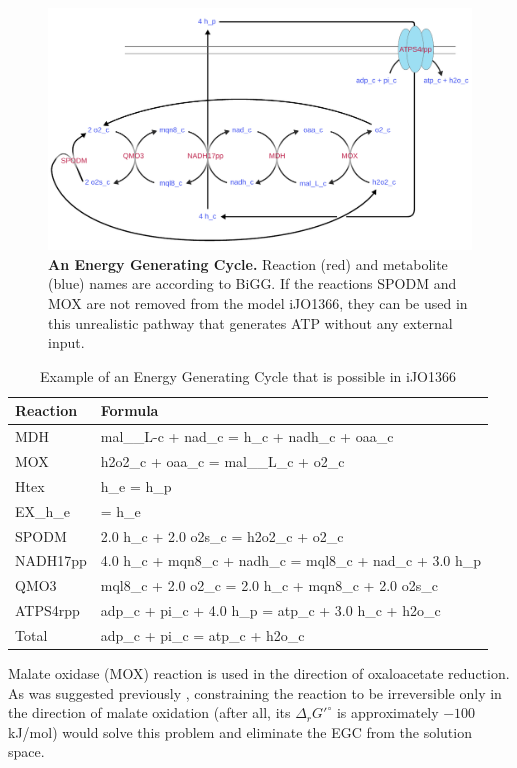 \documentclass[twocolumn]{article}
\begin{document}
\begin{figure}[ht!]
	\includegraphics[width=6in]{figure2.pdf}
 	\caption{\textbf{An Energy Generating Cycle.}
 		Reaction (red) and metabolite (blue) names are according to BiGG.
 		If the reactions SPODM and MOX are not removed from the model iJO1366, they can
 		be used in this unrealistic pathway that generates ATP without any
 		external input.}
 	\label{fig:egc_example}
\end{figure}

\begin{table}[ht!]
	\caption{Example of an Energy Generating Cycle that is possible in iJO1366}
	\begin{tabular}{l|l}
		\label{table:egc_example}
		Reaction & Formula\\\hline
		MDH & mal\_\_L-c + nad\_c = h\_c + nadh\_c + oaa\_c\\
		MOX	& h2o2\_c + oaa\_c = mal\_\_L\_c + o2\_c\\
		Htex & h\_e = h\_p\\
		EX\_h\_e & = h\_e\\
		SPODM & 2.0 h\_c + 2.0 o2s\_c = h2o2\_c + o2\_c\\
		NADH17pp & 4.0 h\_c + mqn8\_c + nadh\_c = mql8\_c + nad\_c + 3.0 h\_p\\
		QMO3 & mql8\_c + 2.0 o2\_c = 2.0 h\_c + mqn8\_c + 2.0 o2s\_c\\
		ATPS4rpp & adp\_c + pi\_c + 4.0 h\_p = atp\_c + 3.0 h\_c + h2o\_c\\\hline
		Total & adp\_c + pi\_c = atp\_c + h2o\_c
	\end{tabular}
\end{table}

Malate oxidase (MOX) reaction is used in the direction of oxaloacetate reduction. As was suggested previously \cite{Fritzemeier2017-ba}, constraining the reaction to be irreversible only in the direction of malate oxidation (after all, its $\Delta_r G'^\circ$ is approximately $-100$ kJ/mol) would solve this problem and eliminate the EGC from the solution space.
\end{document}
